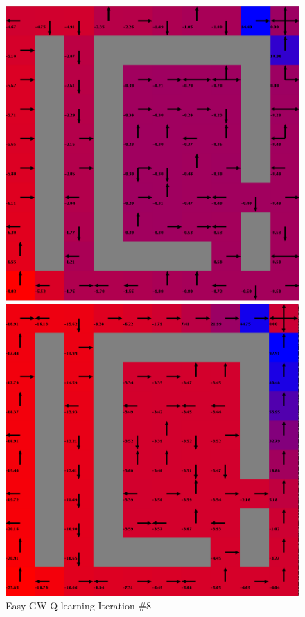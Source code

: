 \documentclass[h]{article}
\begin{document}
    \begin{figure}[H]
      \includegraphics[width=1\textwidth,keepaspectratio]{easy-q-8.png} 
      \caption*{Easy GW Q-learning Iteration \#8} 
   \endminipage\hfill
      \includegraphics[width=1\textwidth,keepaspectratio]{easy-q-50.png} 

\end{figure}
\end{document}
